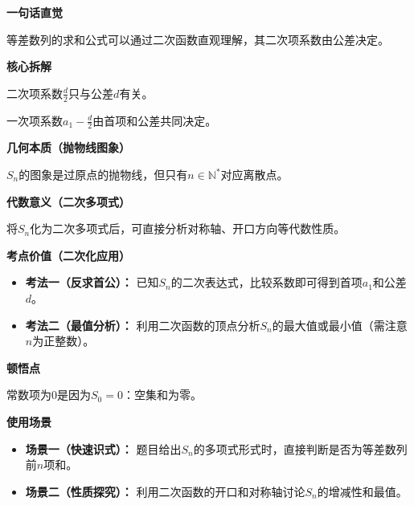 \begin{explanationbox}
	\textbf{\textcolor{CExplanation}{一句话直觉}}

	等差数列的求和公式可以通过二次函数直观理解，其二次项系数由公差决定。

	\medskip
	\textbf{\textcolor{CExplanation}{核心拆解}}
	\begin{description}[style=nextline, leftmargin=2.8em, labelsep=0.5em, itemsep=0.45em]
		\item[\textbf{要点一（二次项来源）：}] 二次项系数$\frac{d}{2}$只与公差$d$有关。
		\item[\textbf{要点二（一次项组合）：}] 一次项系数$a_1 - \frac{d}{2}$由首项和公差共同决定。
	\end{description}

	\medskip
	\textbf{\textcolor{CExplanation}{几何本质（抛物线图象）}}

	$S_n$的图象是过原点的抛物线，但只有$n\in\mathbb{N}^*$对应离散点。

	\medskip
	\textbf{\textcolor{CExplanation}{代数意义（二次多项式）}}

	将$S_n$化为二次多项式后，可直接分析对称轴、开口方向等代数性质。

	\medskip
	\textbf{\textcolor{CExplanation}{考点价值（二次化应用）}}
	\begin{itemize}[leftmargin=*, itemsep=0.5em, topsep=0.4em]
		\item \textbf{考法一（反求首公）：} 已知$S_n$的二次表达式，比较系数即可得到首项$a_1$和公差$d$。
		\item \textbf{考法二（最值分析）：} 利用二次函数的顶点分析$S_n$的最大值或最小值（需注意$n$为正整数）。
	\end{itemize}

	\medskip
	\textbf{\textcolor{CExplanation}{顿悟点}}

	常数项为$0$是因为$S_0=0$：空集和为零。

	\medskip
	\textbf{\textcolor{CExplanation}{使用场景}}
	\begin{itemize}[leftmargin=*, itemsep=0.5em, topsep=0.4em]
		\item \textbf{场景一（快速识式）：} 题目给出$S_n$的多项式形式时，直接判断是否为等差数列前$n$项和。
		\item \textbf{场景二（性质探究）：} 利用二次函数的开口和对称轴讨论$S_n$的增减性和最值。
	\end{itemize}
\end{explanationbox}
